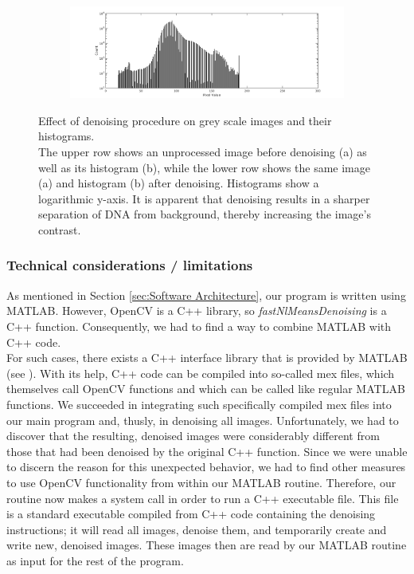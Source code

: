 \documentclass{article}
\begin{document}
\begin{figure}[htb!]
\begin{subfigure}{0.7\textwidth}
		\vspace{0.1cm}
		
		\includegraphics[width=\linewidth]{afterDenoise_histogram.png}
		\caption{}
		\label{fig:denoising_histograms}
	\end{subfigure}
	\caption{Effect of denoising procedure on grey scale images and their histograms.\\
		The upper row shows an unprocessed image before denoising (a) as well as its histogram (b), while the lower row shows the same image (a) and histogram (b) after denoising. Histograms show a logarithmic y-axis. It is apparent that denoising results in a sharper separation of DNA from background, thereby increasing the image's contrast.}
	\label{fig:denoising}
\end{figure}

\subsubsection{Technical considerations / limitations}
As mentioned in Section \ref{sec:Software Architecture}, our program is written using MATLAB. However, OpenCV is a C++ library, so \textit{fastNlMeansDenoising} is a C++ function. Consequently, we had to find a way to combine MATLAB with C++ code. \\
For such cases, there exists a C++ interface library that is provided by MATLAB (see \cite{opencvInterfaceSupport}). With its help, C++ code can be compiled into so-called mex files, which themselves call OpenCV functions and which can be called like regular MATLAB functions. We succeeded in integrating such specifically compiled mex files into our main program and, thusly, in denoising all images. Unfortunately, we had to discover that the resulting, denoised images were considerably different from those that had been denoised by the original C++ function. Since we were unable to discern the reason for this unexpected behavior, we had to find other measures to use OpenCV functionality from within our MATLAB routine. Therefore, our routine now makes a system call in order to run a C++ executable file. This file is a standard executable compiled from C++ code containing the denoising instructions; it will read all images, denoise them, and temporarily create and write new, denoised images. These images then are read by our MATLAB routine as input for the rest of the program.
\end{document}
